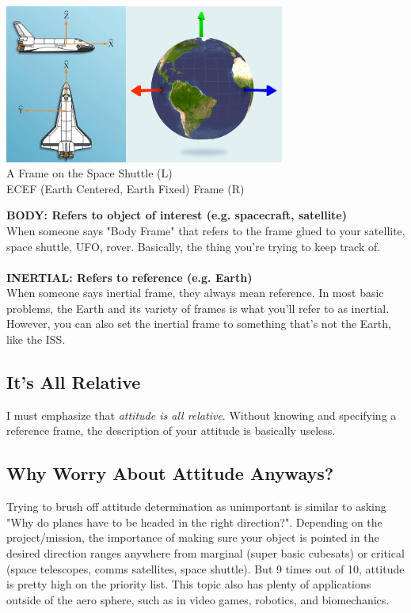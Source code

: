 \documentclass[a4paper,14pt]{extreport}
\begin{document}
\begin{center}
\includegraphics[width=4cm]{shuttle_body_frame}\includegraphics[height=5.2cm]{ecef}\\
A Frame on the Space Shuttle (L) \\ ECEF (Earth Centered, Earth Fixed) Frame (R)
\end{center}
\textbf{BODY: Refers to object of interest (e.g. spacecraft, satellite)}\\
When someone says "Body Frame" that refers to the frame glued to your satellite, space shuttle, UFO, rover. Basically, the thing you're trying to keep track of.\\\\
\textbf{INERTIAL: Refers to reference (e.g. Earth)}\\
When someone says inertial frame, they always mean reference. In most basic problems, the Earth and its variety of frames is what you'll refer to as inertial. However, you can also set the inertial frame to something that's not the Earth, like the ISS.\\

\subsection{It's All Relative}
I must emphasize that \emph{attitude is all relative}. Without knowing and specifying a reference frame, the description of your attitude is basically useless. 

\subsection{Why Worry About Attitude Anyways?}
Trying to brush off attitude determination as unimportant is similar to asking "Why do planes have to be headed in the right direction?". Depending on the project/mission, the importance of making sure your object is pointed in the desired direction ranges anywhere from marginal (super basic cubesats) or critical (space telescopes, comms satellites, space shuttle). But 9 times out of 10, attitude is pretty high on the priority list. This topic also has plenty of applications outside of the aero sphere, such as in video games, robotics, and biomechanics.
\end{document}
